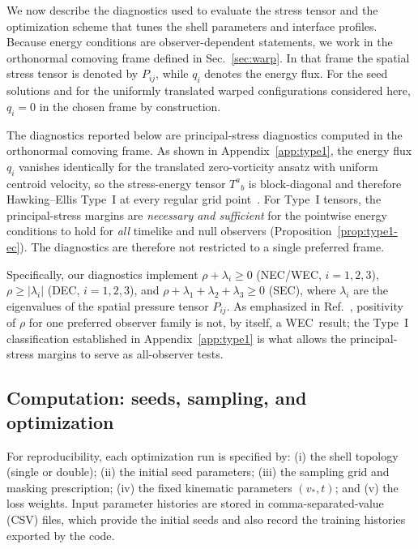\documentclass[11pt]{article}
\makeatletter
\newcommand{\@abbr}[1]{\ifmmode\mathrm{#1}\else\textsc{#1}\fi}
\newcommand{\WEC}{\@abbr{WEC}}
\newcommand{\NEC}{\@abbr{NEC}}
\newcommand{\SEC}{\@abbr{SEC}}
\newcommand{\DEC}{\@abbr{DEC}}
\makeatother
\begin{document}
We now describe the diagnostics used to evaluate the stress tensor and the optimization scheme that tunes the shell parameters and interface profiles.  Because energy conditions are observer-dependent statements, we work in the orthonormal comoving frame defined in Sec.~\ref{sec:warp}. In that frame the spatial stress tensor is denoted by $P_{ij}$, while $q_i$ denotes the energy flux. For the seed solutions and for the uniformly translated warped configurations considered here, $q_i=0$ in the chosen frame by construction.

The diagnostics reported below are principal-stress diagnostics computed in the orthonormal comoving frame. As shown in Appendix~\ref{app:type1}, the energy flux $q_i$ vanishes identically for the translated zero-vorticity ansatz with uniform centroid velocity, so the stress-energy tensor $T^{a}{}_{b}$ is block-diagonal and therefore Hawking--Ellis Type~I at every regular grid point~\cite{HawkingEllis1973,Maeda:2022vld,MartinMoruno:2017exc}. For Type~I tensors, the principal-stress margins are \emph{necessary and sufficient} for the pointwise energy conditions to hold for \emph{all} timelike and null observers (Proposition~\ref{prop:type1-ec}). The diagnostics are therefore not restricted to a single preferred frame.

Specifically, our diagnostics implement $\rho+\lambda_i\ge 0$ (\NEC/\WEC, $i=1,2,3$), $\rho\ge |\lambda_i|$ (\DEC, $i=1,2,3$), and $\rho+\lambda_1+\lambda_2+\lambda_3\ge 0$ (\SEC), where $\lambda_i$ are the eigenvalues of the spatial pressure tensor $P_{ij}$. As emphasized in Ref.~\cite{Santiago:2021aup}, positivity of $\rho$ for one preferred observer family is not, by itself, a \WEC\ result; the Type~I classification established in Appendix~\ref{app:type1} is what allows the principal-stress margins to serve as all-observer tests.

\subsection{Computation: seeds, sampling, and optimization}
\label{sec:comp}
For reproducibility, each optimization run is specified by: (i) the shell topology (single or double); (ii) the initial seed parameters; (iii) the sampling grid and masking prescription; (iv) the fixed kinematic parameters $(v_*,t)$; and (v) the loss weights. Input parameter histories are stored in comma-separated-value (CSV) files, which provide the initial seeds and also record the training histories exported by the code.
\end{document}
